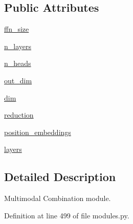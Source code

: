 \subsection*{Public Attributes}
\begin{DoxyCompactItemize}
\item 
\hyperlink{classprojects_1_1image__chat_1_1transresnet__multimodal_1_1modules_1_1MultimodalCombiner_a0af7352a16cba4f0c183a50193b33f78}{ffn\+\_\+size}
\item 
\hyperlink{classprojects_1_1image__chat_1_1transresnet__multimodal_1_1modules_1_1MultimodalCombiner_af1150161d16875a23fe10f61e7aa1cf8}{n\+\_\+layers}
\item 
\hyperlink{classprojects_1_1image__chat_1_1transresnet__multimodal_1_1modules_1_1MultimodalCombiner_a352d2c87e1084b8d3dfe15346d038184}{n\+\_\+heads}
\item 
\hyperlink{classprojects_1_1image__chat_1_1transresnet__multimodal_1_1modules_1_1MultimodalCombiner_ae9db59ed18feccfecfb4c96701c21839}{out\+\_\+dim}
\item 
\hyperlink{classprojects_1_1image__chat_1_1transresnet__multimodal_1_1modules_1_1MultimodalCombiner_aca0caa4e6262ec061a318348d99e517b}{dim}
\item 
\hyperlink{classprojects_1_1image__chat_1_1transresnet__multimodal_1_1modules_1_1MultimodalCombiner_a51a70794d4a9d5b8d6b12515833bcad4}{reduction}
\item 
\hyperlink{classprojects_1_1image__chat_1_1transresnet__multimodal_1_1modules_1_1MultimodalCombiner_a522ea58558cd910ec642c618503b1ccc}{position\+\_\+embeddings}
\item 
\hyperlink{classprojects_1_1image__chat_1_1transresnet__multimodal_1_1modules_1_1MultimodalCombiner_aeb5eb46560988ba57f2577c52058b07c}{layers}
\end{DoxyCompactItemize}


\subsection{Detailed Description}
\begin{DoxyVerb}Multimodal Combination module.
\end{DoxyVerb}
 

Definition at line 499 of file modules.\+py.



